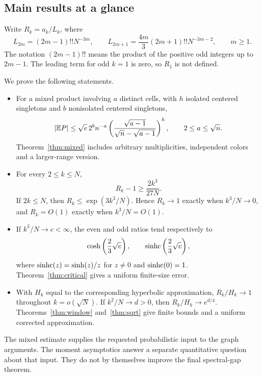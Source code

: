 \subsection{Main results at a glance}

Write $R_k=a_k/L_k$, where
\begin{equation}\label{eq:leading}
L_{2m}=(2m-1)!!N^{-3m},\qquad
L_{2m+1}=\frac{4m}{3}(2m+1)!!N^{-3m-2},\qquad m\ge1.
\end{equation}
The notation $(2m-1)!!$ means the product of the positive odd integers up to $2m-1$. The leading term for odd $k=1$ is zero, so $R_1$ is not defined.

We prove the following statements.
\begin{itemize}
\item For a mixed product involving $a$ distinct cells, with $h$ isolated centered singletons and $b$ nonisolated centered singletons,
\[
|\mathbb E P|\le\sqrt e\,2^b n^{-a}
\left(\frac{\sqrt{a-1}}{\sqrt n-\sqrt{a-1}}\right)^h,
\qquad 2\le a\le\sqrt n.
\]
Theorem~\ref{thm:mixed} includes arbitrary multiplicities, independent colors and a larger-range version.
\item For every $2\le k\le N$,
\[
R_k-1\ge\frac{2k^3}{27N}.
\]
If $2k\le N$, then $R_k\le\exp(3k^3/N)$. Hence $R_k\to1$ exactly when $k^3/N\to0$, and $R_k=O(1)$ exactly when $k^3/N=O(1)$.
\item If $k^3/N\to c<\infty$, the even and odd ratios tend respectively to
\[
\cosh\left(\frac23\sqrt c\right),\qquad
\operatorname{sinhc}\left(\frac23\sqrt c\right),
\]
where $\operatorname{sinhc}(z)=\sinh(z)/z$ for $z\ne0$ and $\operatorname{sinhc}(0)=1$. Theorem~\ref{thm:critical} gives a uniform finite-size error.
\item With $H_k$ equal to the corresponding hyperbolic approximation, $R_k/H_k\to1$ throughout $k=o(\sqrt N)$. If $k^2/N\to d>0$, then $R_k/H_k\to e^{d/4}$. Theorems~\ref{thm:window} and~\ref{thm:sqrt} give finite bounds and a uniform corrected approximation.
\end{itemize}

The mixed estimate supplies the requested probabilistic input to the graph arguments. The moment asymptotics answer a separate quantitative question about that input. They do not by themselves improve the final spectral-gap theorem.
